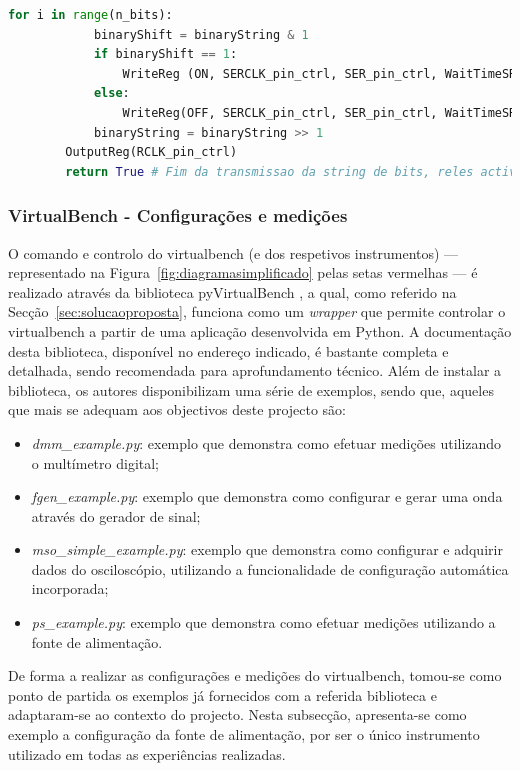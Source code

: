 \begin{minipage}{0.9\linewidth}
	\begin{lstlisting}[language=Python,escapechar=|, caption=\textit{And bit} \textit{bit shift\textunderscore register.py}, label=lst:andbitabit]
		for i in range(n_bits):
			binaryShift = binaryString & 1
			if binaryShift == 1:
				WriteReg (ON, SERCLK_pin_ctrl, SER_pin_ctrl, WaitTimeSR)
			else:
				WriteReg(OFF, SERCLK_pin_ctrl, SER_pin_ctrl, WaitTimeSR)
			binaryString = binaryString >> 1
		OutputReg(RCLK_pin_ctrl)
		return True # Fim da transmissao da string de bits, reles activados
	\end{lstlisting}
\end{minipage}

\subsubsection{VirtualBench - Configurações e medições}
\label{sec:configmedicaoes}
O comando e controlo do \acrshort{virtualbench} (e dos respetivos instrumentos) — representado na Figura~\ref{fig:diagramasimplificado} pelas setas vermelhas — é realizado através da biblioteca pyVirtualBench \cite{docpyvirtualbench}, a qual, como referido na Secção~\ref{sec:solucaoproposta}, funciona como um \textit{wrapper} que permite controlar o \acrshort{virtualbench} a partir de uma aplicação desenvolvida em Python. A documentação desta biblioteca, disponível no endereço indicado, é bastante completa e detalhada, sendo recomendada para aprofundamento técnico. Além de instalar a biblioteca, os autores disponibilizam uma série de exemplos, sendo que, aqueles que mais se adequam aos objectivos deste projecto são:
\begin{itemize}
	\item \textit{dmm\_example.py}: exemplo que demonstra como efetuar medições utilizando o multímetro digital;
	\item \textit{fgen\_example.py}: exemplo que demonstra como configurar e gerar uma onda através do gerador de sinal;
	\item \textit{mso\_simple\_example.py}: exemplo que demonstra como configurar e adquirir dados do osciloscópio, utilizando a funcionalidade de configuração automática incorporada;
	\item \textit{ps\_example.py}: exemplo que demonstra como efetuar medições utilizando a fonte de alimentação.
\end{itemize}

De forma a realizar as configurações e medições do \acrshort{virtualbench}, tomou-se como ponto de partida os exemplos já fornecidos com a referida biblioteca e adaptaram-se ao contexto do projecto. Nesta subsecção, apresenta-se como exemplo a configuração da fonte de alimentação, por ser o único instrumento utilizado em todas as experiências realizadas.  

